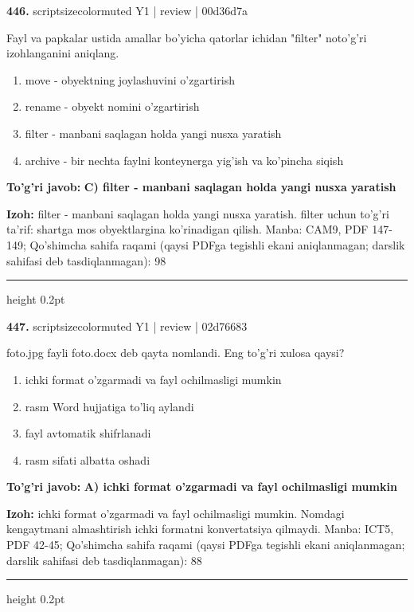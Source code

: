 \documentclass[10pt,a4paper]{article}
\begin{document}
{\bfseries\sffamily\color{ink} 446.} {scriptsizecolor{muted} Y1 | review | 00d36d7a}
\par
Fayl va papkalar ustida amallar bo'yicha qatorlar ichidan "filter" noto'g'ri izohlanganini aniqlang.
\begin{enumerate}[label=\Alph*),leftmargin=9mm]
\item move - obyektning joylashuvini o'zgartirish
\item rename - obyekt nomini o'zgartirish
\item filter - manbani saqlagan holda yangi nusxa yaratish
\item archive - bir nechta faylni konteynerga yig'ish va ko'pincha siqish
\end{enumerate}
\begin{tcolorbox}[enhanced,breakable,colback=teal!4,colframe=teal!60!black,boxrule=0.45pt,arc=1.2mm,left=2.7mm,right=2.7mm,top=1.8mm,bottom=1.8mm,before skip=2mm,after skip=2mm]
{\bfseries\sffamily\color{teal}To'g'ri javob:} \textbf{C) filter - manbani saqlagan holda yangi nusxa yaratish}
\par\smallskip
{\bfseries Izoh:} filter - manbani saqlagan holda yangi nusxa yaratish. filter uchun to'g'ri ta'rif: shartga mos obyektlargina ko'rinadigan qilish. Manba: CAM9, PDF 147-149; Qo'shimcha sahifa raqami (qaysi PDFga tegishli ekani aniqlanmagan; darslik sahifasi deb tasdiqlanmagan): 98
\end{tcolorbox}
\vspace{2mm}\hrule height 0.2pt\vspace{3mm}

{\bfseries\sffamily\color{ink} 447.} {scriptsizecolor{muted} Y1 | review | 02d76683}
\par
foto.jpg fayli foto.docx deb qayta nomlandi. Eng to'g'ri xulosa qaysi?
\begin{enumerate}[label=\Alph*),leftmargin=9mm]
\item ichki format o'zgarmadi va fayl ochilmasligi mumkin
\item rasm Word hujjatiga to'liq aylandi
\item fayl avtomatik shifrlanadi
\item rasm sifati albatta oshadi
\end{enumerate}
\begin{tcolorbox}[enhanced,breakable,colback=teal!4,colframe=teal!60!black,boxrule=0.45pt,arc=1.2mm,left=2.7mm,right=2.7mm,top=1.8mm,bottom=1.8mm,before skip=2mm,after skip=2mm]
{\bfseries\sffamily\color{teal}To'g'ri javob:} \textbf{A) ichki format o'zgarmadi va fayl ochilmasligi mumkin}
\par\smallskip
{\bfseries Izoh:} ichki format o'zgarmadi va fayl ochilmasligi mumkin. Nomdagi kengaytmani almashtirish ichki formatni konvertatsiya qilmaydi. Manba: ICT5, PDF 42-45; Qo'shimcha sahifa raqami (qaysi PDFga tegishli ekani aniqlanmagan; darslik sahifasi deb tasdiqlanmagan): 88
\end{tcolorbox}
\vspace{2mm}\hrule height 0.2pt\vspace{3mm}
\end{document}
